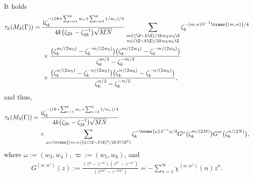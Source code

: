 \begin{prop}\label{prop:WRT_inv}
	It holds
	\begin{align*}
		\tau_k(M_3(\Gamma))
		= {}& \frac{{\rm i} \zeta_{k}^{-(18 + \sum_{v=1}^{6}w_{v} + \sum_{v=3}^{6} 1/w_{v})/4}}{4k \big(\zeta_{2k}-\zeta_{2k}^{-1}\big) \sqrt{MN}}
\sum_{\substack{m \in (\Z \smallsetminus k\Z) / 2kw_3w_4\Z \\ n \in (\Z \smallsetminus k\Z) / 2kw_5w_6\Z}}		\zeta_k^{-(m, n) S^{-1} \trans{(m, n)}/4}
		\\
		&\times\frac{\big( \zeta_k^{m/(2w_3)} - \zeta_k^{-m/(2w_3)} \big) \big( \zeta_k^{m/(2w_4)} - \zeta_k^{-m/(2w_4)} \big)}{ \zeta_k^{m/2} - \zeta_k^{-m/2}}
\\
	&{} \times\frac{\big( \zeta_k^{n/(2w_5)} - \zeta_k^{-n/(2w_5)} \big) \big( \zeta_k^{n/(2w_6)} - \zeta_k^{-n/(2w_6)}\big)}{\zeta_k^{n/2} - \zeta_k^{-n/2}},
	\end{align*}
	and thus,\begin{gather*}
\begin{split}
&		\tau_k(M_3(\Gamma))
		=  \frac{{\rm i} \zeta_{k}^{-(18 + \sum_{v=1}^{6}w_{v} + \sum_{v=3}^{6} 1/w_{v})/4}}{4k \big(\zeta_{2k}-\zeta_{2k}^{-1}\big) \sqrt{MN}}
\\
&\hphantom{\tau_k(M_3(\Gamma))=}{}
\times\sum_{\mu = \trans{(m, n)} \in (\Z \smallsetminus k\Z)^2/2kS(\Z^2)}
\zeta_k^{-\trans{\mu} S^{-1} \mu/4}G^\omega\big(\zeta_k^{m/(2M)}\big) G^\varpi\big(\zeta_k^{n/(2N)}\big),
\end{split}
	\end{gather*}
where $ \omega := (w_3, w_4)$, $\varpi := (w_5, w_6) $, and\vspace{-1ex}
	\begin{gather*}
	G^{(w, w')}(z) :=
	\frac{(z^{w} - z^{-w})(z^{w'} - z^{-w'})}{(z^{ww'} - z^{-ww'})}
	=
	- \sum_{n=1}^{\infty} \chi^{(w, w')} (n) z^n.
	\end{gather*}
\end{prop}
